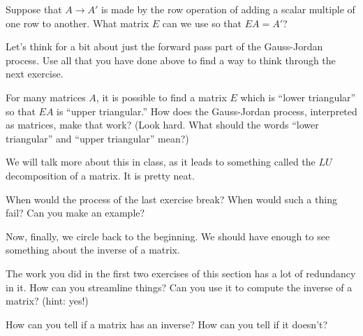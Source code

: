 \documentclass[elementsmain.tex]{subfiles}
\begin{document}
\begin{exercise} Suppose that $A\rightarrow A'$ is made by the row operation of adding a scalar multiple of one row to another. What matrix $E$ can we use so that $EA = A'$?
\end{exercise} 

Let's think for a bit about just the forward pass part of the Gauss-Jordan process. Use all that you have done above to find a way to think through the next exercise.

\begin{exercise}
For many matrices $A$, it is possible to find a matrix $E$ which is ``lower triangular'' 
so that $EA$ is ``upper triangular.'' How does the Gauss-Jordan process, interpreted as matrices, make that work? (Look hard. What should the words ``lower triangular'' and ``upper triangular'' mean?)
\end{exercise}

We will talk more about this in class, as it leads to something called the $LU$ decomposition of a matrix. It is pretty neat.

\begin{exercise}
When would the process of the last exercise break? When would such a thing fail? Can you make an example?
\end{exercise}


Now, finally, we circle back to the beginning. We should have enough to see something about the inverse of a matrix.

\begin{exercise}
The work you did in the first two exercises of this section has a lot of redundancy in it. How can you streamline things? Can you use it to compute the inverse of a matrix? (hint: yes!)
\end{exercise}

\begin{exercise}
How can you tell if a matrix has an inverse? How can you tell if it doesn't? 
\end{exercise}


\clearpage
\end{document}
